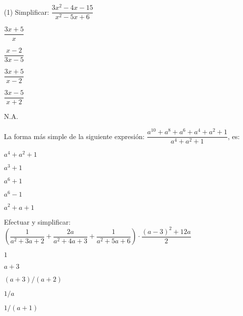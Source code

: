 \documentclass{sn-guia}
\begin{document}
\begin{ejercicios}(1)
    \task Simplificar: \hspace*{5pt}$\dfrac{3x^2-4x-15}{x^2-5x+6}$\hspace*{5pt}
        \begin{malla}[height=4cm,enlarge top by=10pt]
        \end{malla}
        \begin{alternativas*}[]
            \item $\dfrac{3x+5}{x}$
            \item $\dfrac{x-2}{3x-5}$
            \item $\dfrac{3x+5}{x-2}$
            \item $\dfrac{3x-5}{x+2}$
            \item N.A.
        \end{alternativas*}

    \task %
        La forma más simple de la siguiente expresión: \hspace*{5pt}$\dfrac{a^{10}+a^8+a^6+a^4+a^2+1}{a^4+a^2+1}$\hspace*{5pt}, es:
        \begin{malla}[height=4cm,enlarge top by=10pt]
        \end{malla}
        \begin{alternativas*}[]
            \item $a^4+a^2+1$
            \item $a^3+1$
            \item $a^6+1$
            \item $a^6-1$
            \item $a^2 +a +1$
        \end{alternativas*}

        \task Efectuar y simplificar: \hspace*{5pt}$\left(\dfrac{1}{a^2+3a+2}+\dfrac{2a}{a^2+4a+3}+\dfrac{1}{a^2+5a+6}\right)\cdot \dfrac{(a-3)^2+12a}{2}$\hspace*{5pt}
        \begin{malla}[height=4cm,enlarge top by=10pt]
        \end{malla}
        \begin{alternativas*}[]
            \item $1$
            \item $a+3$
            \item $(a+3)/(a+2)$
            \item $1/a$
            \item $1/(a+1)$
        \end{alternativas*}


\end{ejercicios}
\end{document}
